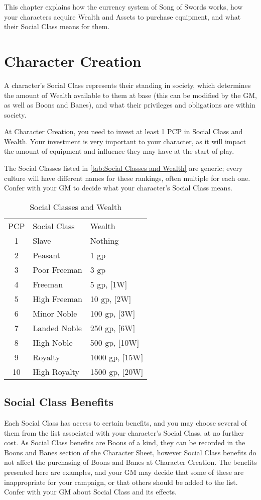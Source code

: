\documentclass[oneside,11pt,english]{book}
\begin{document}
This chapter explains how the currency system of Song of Swords works, how your characters acquire 
Wealth and Assets to purchase equipment, and what their Social Class means for them. 
\section{Character Creation}
A character’s Social Class represents their standing in society, which determines the amount of Wealth available to them at base (this can be modified by the GM, as well as Boons and Banes), and what their privileges and obligations are within society.


At Character Creation, you need to invest at least 1 PCP in Social Class and Wealth. Your investment is very important to your character, as it will impact the amount of equipment and influence they may have at the start of play.


The Social Classes listed in \autoref{tab:Social Classes and Wealth} are generic; every culture will have different names for these 
rankings, often multiple for each one. Confer with your GM to decide what your character’s Social Class 
means.
\begin{wraptable}{r}{7.5 cm}
	\centering
	\caption{Social Classes and Wealth}
	\label{tab:Social Classes and Wealth}
	\begin{tabu} spread 0pt{cXX}
PCP		&Social Class	&Wealth\\
1		&Slave			&Nothing\\
2		&Peasant		&1 gp\\
3		&Poor Freeman	&3 gp\\
4		&Freeman		&5 gp, [1W]\\
5		&High Freeman	&10 gp, [2W]\\
6		&Minor Noble	&100 gp, [3W]\\
7		&Landed Noble	&250 gp, [6W]\\
8		&High Noble		&500 gp, [10W]\\
9		&Royalty		&1000 gp, [15W]\\
10		&High Royalty	&1500 gp, [20W]\\
	\end{tabu}
\end{wraptable}
\subsection{Social Class Benefits} Each Social Class has access to certain benefits, and you may choose several of them from the list associated with your character’s Social Class, at no further cost. As Social Class benefits are Boons of a kind, they can be recorded in the Boons and Banes section of the Character Sheet, however Social Class benefits do not affect the purchasing of Boons and Banes at Character Creation.
The benefits presented here are examples, and your GM may decide that some of these are inappropriate for your campaign, or that others should be added to the list. Confer with your GM about Social Class and its effects.
\end{document}
